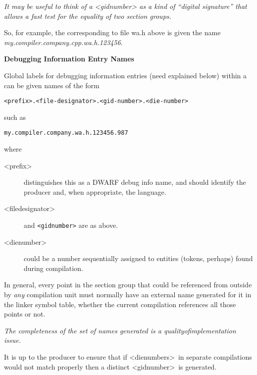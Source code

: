\textit{It may be useful to think of a 
\textless gid\dash number\textgreater
as a kind
of ``digital signature'' that allows a fast test for the
equality of two 
section groups.}

So, for example, the  
corresponding to file wa.h
above is given the name \textit{my.compiler.company.cpp.wa.h.123456}.



\textbf{Debugging Information Entry Names}

Global labels for 
debugging information entries (need explained
below) within a 
can be given names of the form

\begin{alltt}
    <prefix>.<file-designator>.<gid-number>.<die-number>
\end{alltt}

such as

\begin{alltt}
    my.compiler.company.wa.h.123456.987
\end{alltt}

where
\begin{description}
\item [\textless prefix\textgreater]  
distinguishes this as a DWARF debug info name, and should identify the producer
and, when appropriate, the language.
\item [\textless file\dash designator\textgreater]  
and 
\texttt{\textless gid\dash number\textgreater} 
are as above.

\item  [\textless die\dash number\textgreater]
could be a number sequentially assigned 
to entities (tokens, perhaps) found
during compilation.

\end{description}

In general, every point in the 
section group 
 that
could be referenced from outside by \emph{any} compilation unit must
normally have an external name generated for it in the linker
symbol table, whether the current compilation references all
those points or not.

\textit{The completeness of the set of names generated is a
quality\dash of\dash implementation issue.}

It is up to the producer to ensure that if 
\textless die\dash numbers\textgreater\ 
in separate compilations would not match properly then a
distinct 
\textless gid\dash number\textgreater\ 
is generated.

